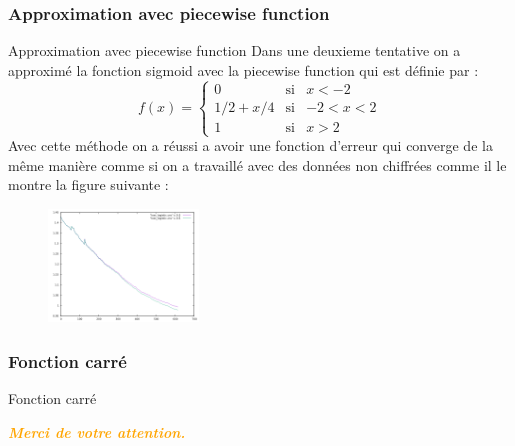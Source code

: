 \documentclass{beamer}
\begin{document}
\subsubsection{Approximation avec piecewise function}
\begin{frame}{Approximation avec piecewise function}
Dans une deuxieme tentative on a approximé la fonction sigmoid avec la piecewise function qui est définie par :\newline
 \begin{equation}
f(x)=
\left\lbrace
\begin{array}{ccc}
0  & \mbox{si} & x<-2\\
1/2 + x/4 & \mbox{si} & -2<x<2\\
1 & \mbox{si} & x>2
\end{array}\right.
\end{equation}
Avec cette méthode on a réussi a avoir une fonction d'erreur qui converge de la même manière comme si on a travaillé avec des données non chiffrées comme il le montre la figure suivante :
\begin{figure}[h!]\begin{center}
             \includegraphics[width=4cm]{loss_logistic_regression.png}
             \end{center}
             \end{figure}
\end{frame}
\subsubsection{Fonction carré}
\begin{frame}{Fonction carré}
\end{frame}
\begin{frame}
	\begin{center}
	\textcolor{orange}{\textbf{\textit{Merci de votre attention.}}}
	\end{center}
\end{frame}
\end{document}
